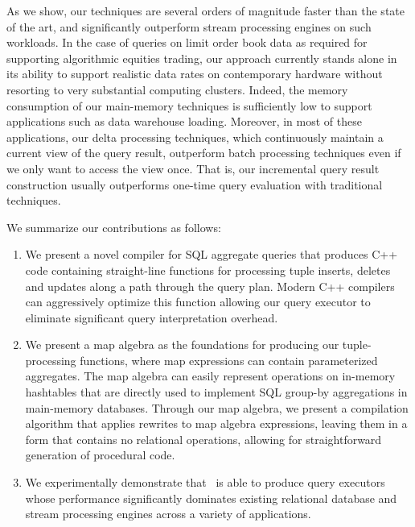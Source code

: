 As we  show, our techniques are several orders of  magnitude   faster  than
the state of the art,  and significantly outperform stream processing
engines on such workloads.  In the case of queries on limit order  book  data  as
 required for  supporting  algorithmic  equities trading, our approach currently
stands alone in its ability to support realistic  data rates  on contemporary
hardware without  resorting to very substantial computing clusters. Indeed, the
memory consumption of our main-memory techniques is sufficiently low to support
applications such as data warehouse loading. Moreover, in most of these
applications, our delta processing techniques, which continuously maintain a
current view of the query result, outperform batch processing techniques even if
we only want to access the view once. That is, our incremental query result
construction usually outperforms one-time query evaluation with traditional
techniques.


We summarize our contributions as follows:

\begin{enumerate}
  \item We present a novel compiler for SQL aggregate queries
  that produces C++ code containing
  straight-line functions for processing tuple inserts, deletes and updates
  along a path through the query plan. Modern C++ compilers can aggressively
  optimize this function allowing our query executor to eliminate significant
  query interpretation overhead.
  \item We present a map algebra as the foundations for producing our
  tuple-processing functions, where map expressions can contain parameterized
  aggregates. The map algebra can easily represent operations on in-memory
  hashtables that are directly used to implement SQL group-by aggregations in
  main-memory data\-ba\-ses. Through our map algebra, we present a compilation
  algorithm that applies rewrites to map algebra expressions, leaving them in a
  form that contains no relational operations, allowing for straightforward
  generation of procedural code.
  \item We experimentally demonstrate that \compiler\ is able to produce
  query executors whose performance significantly dominates existing relational
  database and stream processing engines across a variety of applications. 
\end{enumerate}


